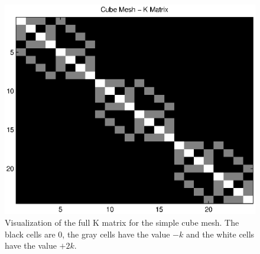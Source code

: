 \documentclass{article}
\begin{document}
  \begin{figure}[H]
    \begin{center}
        \includegraphics[width=0.8\columnwidth]{cube_mesh_Kmatrix} 
    \end{center} 
    \caption{Visualization of the full K matrix for the simple cube mesh. The
              black cells are $0$, the gray cells have the value $-k$ and the white
              cells have the value $+2k$.}
  \end{figure}
\end{document}
